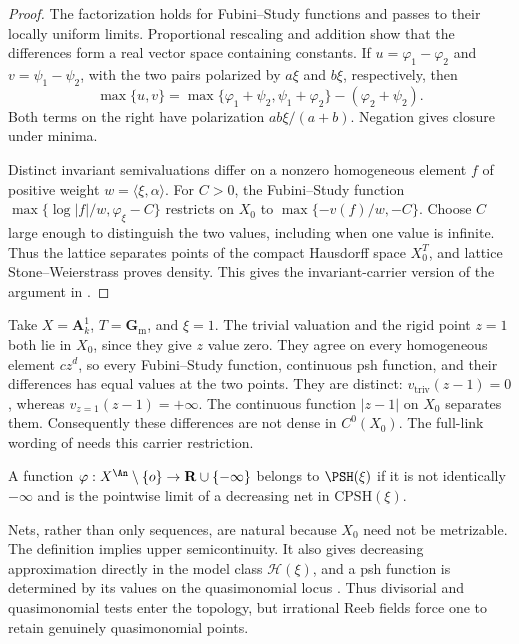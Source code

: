 \begin{proof}
The factorization holds for Fubini--Study functions and passes to their
locally uniform limits.  Proportional rescaling and addition show that the
differences form a real vector space containing constants.  If
$u=\varphi_1-\varphi_2$ and $v=\psi_1-\psi_2$, with the two pairs
polarized by $a\xi$ and $b\xi$, respectively, then
\[
 \max\{u,v\}
 =\max\{\varphi_1+\psi_2,\psi_1+\varphi_2\}
       -(\varphi_2+\psi_2).
\]
Both terms on the right have polarization $ab\xi/(a+b)$.  Negation gives
closure under minima.

Distinct invariant semivaluations differ on a nonzero homogeneous element
$f$ of positive weight $w=\langle\xi,\alpha\rangle$.  For $C>0$,
the Fubini--Study function
$\max\{\log|f|/w,\varphi_\xi-C\}$ restricts on $X_0$ to
$\max\{-v(f)/w,-C\}$.  Choose $C$ large enough to distinguish the
two values, including when one value is infinite.  Thus the lattice
separates points of the compact Hausdorff space $X_0^T$, and lattice
Stone--Weierstrass proves density.  This gives the invariant-carrier version
of the argument in \cite[Theorem~3.5]{Wu24AffineCones}.
\end{proof}

\begin{example}
\label{ex:local-cone-full-link-density-failure}
Take $X=\mathbf A_k^1$, $T=\mathbf G_{\mathrm m}$, and $\xi=1$.
The trivial valuation and the rigid point $z=1$ both lie in $X_0$,
since they give $z$ value zero.  They agree on every homogeneous element
$cz^d$, so every Fubini--Study function, continuous psh function, and
their differences has equal values at the two points.  They are distinct:
$v_{\mathrm{triv}}(z-1)=0$, whereas $v_{z=1}(z-1)=+\infty$.
The continuous function $|z-1|$ on $X_0$ separates them.  Consequently
these differences are not dense in $C^0(X_0)$.  The full-link wording of
\cite[Theorem~3.5]{Wu24AffineCones} needs this carrier restriction.
\end{example}

\begin{definition}
\label{def:local-cone-psh}
A function $\varphi:X^{\An}\setminus\{o\}\to
\mathbf R\cup\{-\infty\}$ belongs to $\PSH(\xi)$ if it is not identically
$-\infty$ and is the pointwise limit of a decreasing net in
$\mathrm{CPSH}(\xi)$.
\end{definition}

Nets, rather than only sequences, are natural because $X_0$ need not be
metrizable.  The definition implies upper semicontinuity.  It also gives
decreasing approximation directly in the model class
$\mathcal H(\xi)$, and a psh function is determined by its values on the
quasimonomial locus \cite[Proposition~5.2 and Theorem~5.8]{Wu24AffineCones}.
Thus divisorial and quasimonomial tests enter the topology, but irrational
Reeb fields force one to retain genuinely quasimonomial points.

